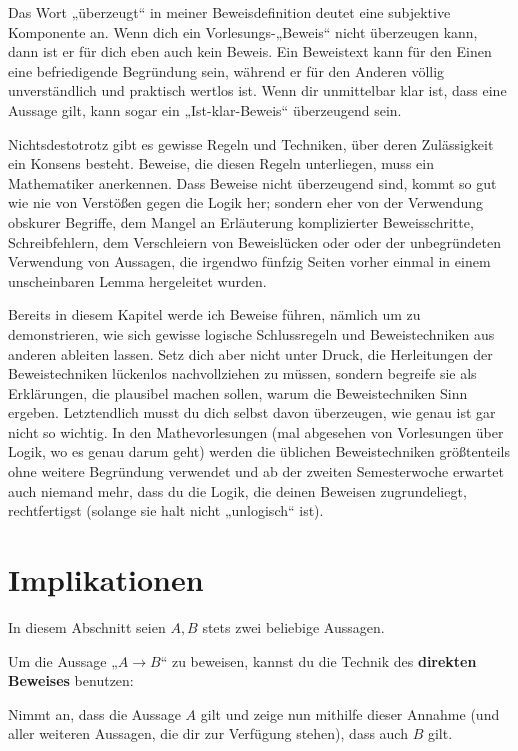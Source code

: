 \begin{bem}
    Das Wort „überzeugt“ in meiner Beweisdefinition deutet eine subjektive Komponente an. Wenn dich ein Vorlesungs-„Beweis“ nicht überzeugen kann, dann ist er für dich eben auch kein Beweis. Ein Beweistext kann für den Einen eine befriedigende Begründung sein, während er für den Anderen völlig unverständlich und praktisch wertlos ist. Wenn dir unmittelbar klar ist, dass eine Aussage gilt, kann sogar ein „Ist-klar-Beweis“ überzeugend sein.
    
    Nichtsdestotrotz gibt es gewisse Regeln und Techniken, über deren Zulässigkeit ein Konsens besteht. Beweise, die diesen Regeln unterliegen, muss ein Mathematiker anerkennen. Dass Beweise nicht überzeugend sind, kommt so gut wie nie von Verstößen gegen die Logik her; sondern eher von der Verwendung obskurer Begriffe, dem Mangel an Erläuterung komplizierter Beweisschritte, Schreibfehlern, dem Verschleiern von Beweislücken oder oder der unbegründeten Verwendung von Aussagen, die irgendwo fünfzig Seiten vorher einmal in einem unscheinbaren Lemma hergeleitet wurden.
\end{bem}


Bereits in diesem Kapitel werde ich Beweise führen, nämlich um zu demonstrieren, wie sich gewisse logische Schlussregeln und Beweistechniken aus anderen ableiten lassen. Setz dich aber nicht unter Druck, die Herleitungen der Beweistechniken lückenlos nachvollziehen zu müssen, sondern begreife sie als Erklärungen, die plausibel machen sollen, warum die Beweistechniken Sinn ergeben. Letztendlich musst du dich selbst davon überzeugen, wie genau ist gar nicht so wichtig. In den Mathevorlesungen (mal abgesehen von Vorlesungen über Logik, wo es genau darum geht) werden die üblichen Beweistechniken größtenteils ohne weitere Begründung verwendet und ab der zweiten Semesterwoche erwartet auch niemand mehr, dass du die Logik, die deinen Beweisen zugrundeliegt, rechtfertigst (solange sie halt nicht „unlogisch“ ist).





\section{Implikationen}


In diesem Abschnitt seien $A,B$ stets zwei beliebige Aussagen.


\begin{axiom} \label{direkterbeweis} 
    Um die Aussage „$A\to B$“ zu beweisen, kannst du die Technik des \textbf{direkten Beweises} benutzen:
    
    Nimmt an, dass die Aussage $A$ gilt und zeige nun mithilfe dieser Annahme (und aller weiteren Aussagen, die dir zur Verfügung stehen), dass auch $B$ gilt.
\end{axiom}


